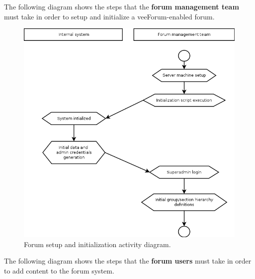 \documentclass[12pt]{report}
\renewcommand\emph{\textbf}
\begin{document}
                    \newpage

                    The following diagram shows the steps that the \emph{forum management team} must take in order to setup and initialize a veeForum-enabled forum.

                    \begin{figure}[H]
                    \caption{Forum setup and initialization activity diagram.}
                    \centering
                    \includegraphics[width=1\textwidth]{uc/a1}
                    \end{figure}

                    \newpage

                    The following diagram shows the steps that the \emph{forum users} must take in order to add content to the forum system.
\end{document}
